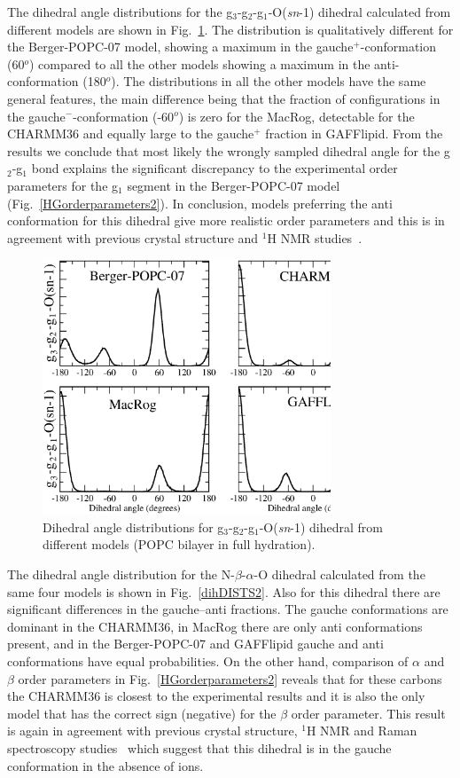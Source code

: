 \documentclass[journal=jacsat,manuscript=article]{achemso}
\begin{document}
The dihedral angle distributions for the  g$_3$-g$_2$-g$_1$-O(\textit{sn}-1) dihedral calculated from different models are
shown in Fig.~\ref{dihDISTS}. The distribution is qualitatively different for the Berger-POPC-07 model, showing a maximum in 
the gauche$^+$-conformation (60$^o$) compared to all the other models showing a maximum in the anti-conformation (180$^o$).
The distributions in all the other models have the same general features, the main difference being that the
fraction of configurations in the gauche$^-$-conformation (-60$^o$) is zero for the MacRog, detectable for the CHARMM36 and
equally large to the gauche$^+$ fraction in GAFFlipid. From the results we conclude that most likely the wrongly sampled
dihedral angle for the g$_2$-g$_1$ bond explains the significant discrepancy to the experimental order parameters
for the g$_1$ segment in the Berger-POPC-07 model (Fig.~\ref{HGorderparameters2}). 
In conclusion, models preferring the anti conformation for this dihedral give more realistic order parameters and
this is in agreement with previous crystal structure and $^1$H NMR studies~\cite{hauser80,hauser81,hauser81b,hauser88,pascher92,marsh06}.
\begin{figure}[]
  \centering
  \includegraphics[width=8.6cm]{g1-g2_Cdihs2.eps}
  \caption{\label{dihDISTS}
    Dihedral angle distributions for g$_3$-g$_2$-g$_1$-O(\textit{sn}-1) dihedral from different models (POPC bilayer in full hydration).
      } 
\end{figure}

The dihedral angle distribution for the  N-$\beta$-$\alpha$-O dihedral calculated from the same four models is 
shown in Fig.~\ref{dihDISTS2}. Also for this dihedral there are significant differences in the gauche--anti fractions.
The gauche conformations are dominant in the CHARMM36, in MacRog there are only anti conformations present,
and in the Berger-POPC-07 and GAFFlipid gauche and anti conformations have equal probabilities. 
On the other hand, comparison of $\alpha$ and $\beta$ order parameters in Fig.~\ref{HGorderparameters2}
reveals that for these carbons the CHARMM36 is closest to the experimental results and it is also the only model that has the correct
sign (negative) for the $\beta$ order parameter. This result is again in agreement with previous 
crystal structure, $^1$H NMR and Raman spectroscopy studies~\cite{hauser80,hauser81,hauser81b,akutsu81b} which suggest that
this dihedral is in the gauche conformation in the absence of ions.
\end{document}
